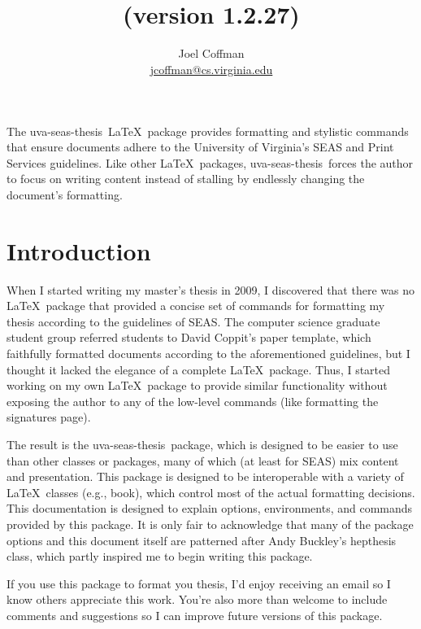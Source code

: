 \documentclass[10pt]{article}
\title{\thispackage\\{\normalsize (version 1.2.27)}}
\author{
  Joel Coffman\\
  \url{jcoffman@cs.virginia.edu}
}
\newcommand{\class}[1]{#1}
\newcommand{\package}[1]{#1}
\newcommand{\thispackage}{\package{uva-seas-thesis}}
\begin{document}
\maketitle

The \thispackage\ \LaTeX\ package provides formatting and stylistic commands that ensure documents adhere to the University of Virginia's \gls{SEAS} and Print Services guidelines.
Like other \LaTeX\ packages, \thispackage\ forces the author to focus on writing content instead of stalling by endlessly changing the document's formatting.

\section{Introduction}\label{section:introduction}
When I started writing my master's thesis in 2009, I discovered that there was no \LaTeX\ package that provided a concise set of commands for formatting my thesis according to the guidelines of \gls{SEAS}.
The computer science graduate student group referred students to David Coppit's paper template, which faithfully formatted documents according to the aforementioned guidelines, but I thought it lacked the elegance of a complete \LaTeX\ package.
Thus, I started working on my own \LaTeX\ package to provide similar functionality without exposing the author to any of the low-level commands (like formatting the signatures page).

The result is the \thispackage\ package, which is designed to be easier to use than other classes or packages, many of which (at least for \gls{SEAS}) mix content and presentation.
This package is designed to be interoperable with a variety of \LaTeX\ classes (e.g., \class{book}), which control most of the actual formatting decisions.
This documentation is designed to explain options, environments, and commands provided by this package.
It is only fair to acknowledge that many of the package options and this document itself are patterned after Andy Buckley's \class{hepthesis} class, which partly inspired me to begin writing this package.

If you use this package to format you thesis, I'd enjoy receiving an email so I know others appreciate this work.
You're also more than welcome to include comments and suggestions so I can improve future versions of this package.

\end{document}
